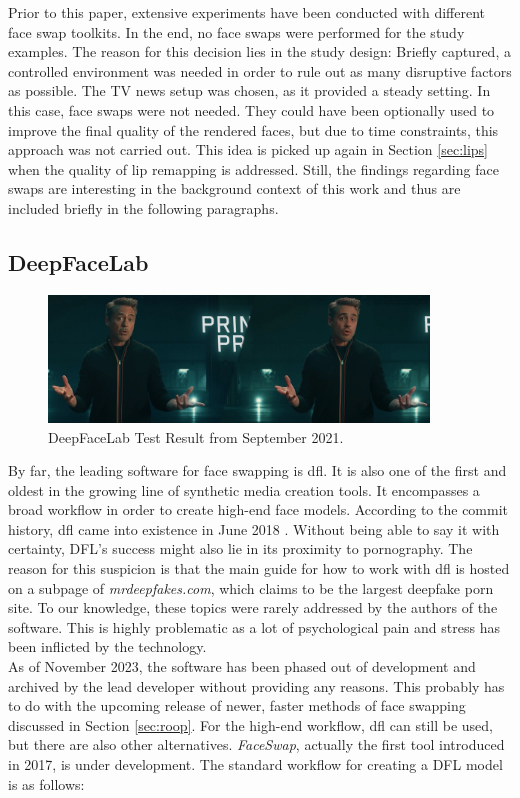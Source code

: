 \documentclass[
  a4paper,  %
  twoside,  %
  bibliography=totoc,
  headsepline,
  cleardoublepage=empty,
  parskip=half,
  draft=false
]{scrbook}
\begin{document}
Prior to this paper, extensive experiments have been conducted with different face swap toolkits. In the end, no face swaps were performed for the study examples. The reason for this decision lies in the study design: Briefly captured, a controlled environment was needed in order to rule out as many disruptive factors as possible. The TV news setup was chosen, as it provided a steady setting. In this case, face swaps were not needed. They could have been optionally used to improve the final quality of the rendered faces, but due to time constraints, this approach was not carried out. This idea is picked up again in Section \ref{sec:lips} when the quality of lip remapping is addressed.
Still, the findings regarding face swaps are interesting in the background context of this work and thus are included briefly in the following paragraphs.

\subsection{DeepFaceLab}
\begin{figure}[h]
  \centering
  \includegraphics[width=0.9\textwidth]{./graphics/dfl-demo.png}
  \caption{DeepFaceLab Test Result from September 2021.}
  \label{fig:dfl-sample}
\end{figure}
By far, the leading software for face swapping is \gls{dfl}. It is also one of the first and oldest in the growing line of synthetic media creation tools. It encompasses a broad workflow in order to create high-end face models. According to the commit history, \gls{dfl} came into existence in June 2018 \cite{iperovCommitsIperovDeepFaceLab}. Without being able to say it with certainty, DFL's success might also lie in its proximity to pornography. The reason for this suspicion is that the main guide for how to work with \gls{dfl} is hosted on a subpage of \textit{mrdeepfakes.com}, which claims to be the largest deepfake porn site. To our knowledge, these topics were rarely addressed by the authors of the software. This is highly problematic as a lot of psychological pain and stress has been inflicted by the technology.\\
As of November 2023, the software has been phased out of development and archived by the lead developer without providing any reasons. This probably has to do with the upcoming release of newer, faster methods of face swapping discussed in Section \ref{sec:roop}. For the high-end workflow, \gls{dfl} can still be used, but there are also other alternatives. \textit{FaceSwap}, actually the first tool introduced in 2017, is under development. The standard workflow for creating a DFL model is as follows:
\end{document}
